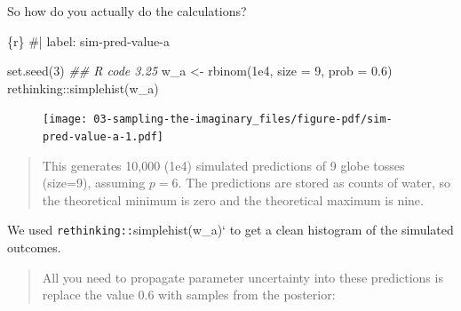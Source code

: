\documentclass[
  letterpaper,
  DIV=11,
  numbers=noendperiod]{scrreprt}
\newenvironment{Shaded}{\begin{snugshade}}{\end{snugshade}}
\newcommand{\AttributeTok}[1]{\textcolor[rgb]{0.40,0.45,0.13}{#1}}
\newcommand{\CommentTok}[1]{\textcolor[rgb]{0.37,0.37,0.37}{#1}}
\newcommand{\DecValTok}[1]{\textcolor[rgb]{0.68,0.00,0.00}{#1}}
\newcommand{\DocumentationTok}[1]{\textcolor[rgb]{0.37,0.37,0.37}{\textit{#1}}}
\newcommand{\FloatTok}[1]{\textcolor[rgb]{0.68,0.00,0.00}{#1}}
\newcommand{\FunctionTok}[1]{\textcolor[rgb]{0.28,0.35,0.67}{#1}}
\newcommand{\InformationTok}[1]{\textcolor[rgb]{0.37,0.37,0.37}{#1}}
\newcommand{\NormalTok}[1]{\textcolor[rgb]{0.00,0.23,0.31}{#1}}
\newcommand{\OtherTok}[1]{\textcolor[rgb]{0.00,0.23,0.31}{#1}}
\newcommand{\SpecialCharTok}[1]{\textcolor[rgb]{0.37,0.37,0.37}{#1}}
\begin{document}
So how do you actually do the calculations?

\begin{Shaded}
\begin{Highlighting}[]
\InformationTok{\textasciigrave{}\textasciigrave{}\textasciigrave{}\{r\}}
\CommentTok{\#| label: sim{-}pred{-}value{-}a}

\FunctionTok{set.seed}\NormalTok{(}\DecValTok{3}\NormalTok{)}
\DocumentationTok{\#\# R code 3.25}
\NormalTok{w\_a }\OtherTok{\textless{}{-}} \FunctionTok{rbinom}\NormalTok{(}\FloatTok{1e4}\NormalTok{, }\AttributeTok{size =} \DecValTok{9}\NormalTok{, }\AttributeTok{prob =} \FloatTok{0.6}\NormalTok{)}
\NormalTok{rethinking}\SpecialCharTok{::}\FunctionTok{simplehist}\NormalTok{(w\_a)}
\InformationTok{\textasciigrave{}\textasciigrave{}\textasciigrave{}}
\end{Highlighting}
\end{Shaded}

\begin{figure}[H]

{\centering \texttt{[image: 03-sampling-the-imaginary\_files/figure-pdf/sim-pred-value-a-1.pdf]}

}

\end{figure}

\begin{quote}
This generates 10,000 (1e4) simulated predictions of 9 globe tosses
(size=9), assuming \(p = 6\). The predictions are stored as counts of
water, so the theoretical minimum is zero and the theoretical maximum is
nine.
\end{quote}

We used \texttt{rethinking::}simplehist(w\_a)` to get a clean histogram
of the simulated outcomes.

\begin{quote}
All you need to propagate parameter uncertainty into these predictions
is replace the value 0.6 with samples from the posterior:
\end{quote}
\end{document}
